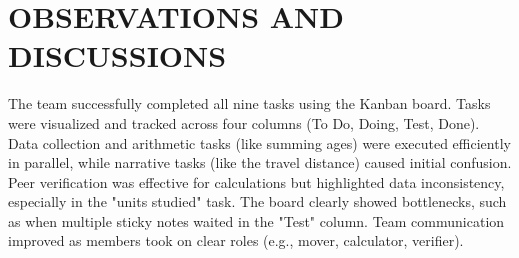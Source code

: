 \chapter{OBSERVATIONS AND DISCUSSIONS}\label{ch:experimental_result}
The team successfully completed all nine tasks using the Kanban board. Tasks were visualized and tracked across four columns (To Do, Doing, Test, Done). Data collection and arithmetic tasks (like summing ages) were executed efficiently in parallel, while narrative tasks (like the travel distance) caused initial confusion. Peer verification was effective for calculations but highlighted data inconsistency, especially in the "units studied" task. The board clearly showed bottlenecks, such as when multiple sticky notes waited in the "Test" column. Team communication improved as members took on clear roles (e.g., mover, calculator, verifier).

